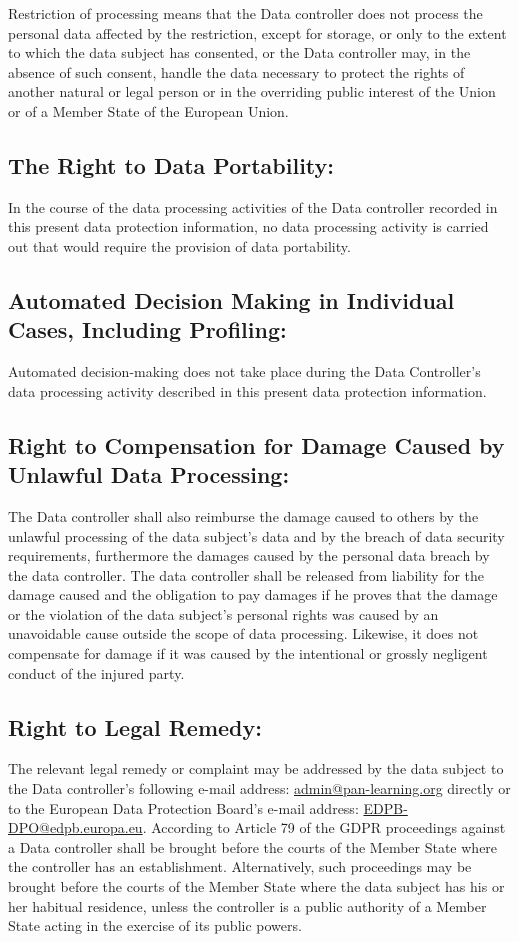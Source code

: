 \documentclass[11pt]{article}
\begin{document}
Restriction of processing means that the Data controller does not process the personal data affected by the restriction, except for storage, or only to the extent to which the data subject has consented, or the Data controller may, in the absence of such consent, handle the data necessary to protect the rights of another natural or legal person or in the overriding public interest of the Union or of a Member State of the European Union. 

\subsection{The Right to Data Portability:}
In the course of the data processing activities of the Data controller recorded in this present data protection information, no data processing activity is carried out that would require the provision of data portability.

\subsection{Automated Decision Making in Individual Cases, Including Profiling:}
Automated decision-making does not take place during the Data Controller's data processing activity described in this present data protection information.

\subsection{Right to Compensation for Damage Caused by Unlawful Data Processing:}
The Data controller shall also reimburse the damage caused to others by the unlawful processing of the data subject's data and by the breach of data security requirements, furthermore the damages caused by the personal data breach by the data controller. The data controller shall be released from liability for the damage caused and the obligation to pay damages if he proves that the damage or the violation of the data subject's personal rights was caused by an unavoidable cause outside the scope of data processing. Likewise, it does not compensate for damage if it was caused by the intentional or grossly negligent conduct of the injured party.

\subsection{Right to Legal Remedy:}
The relevant legal remedy or complaint may be addressed by the data subject to the Data controller's following e-mail address: \href{mailto:admin@pan-learning.org}{admin@pan-learning.org} directly or to the European Data Protection Board’s e-mail address: \href{mailto:EDPB-DPO@edpb.europa.eu}{EDPB-DPO@edpb.europa.eu}. According to Article 79 of the GDPR proceedings against a Data controller shall be brought before the courts of the Member State where the controller has an establishment. Alternatively, such proceedings may be brought before the courts of the Member State where the data subject has his or her habitual residence, unless the controller is a public authority of a Member State acting in the exercise of its public powers.
\end{document}
